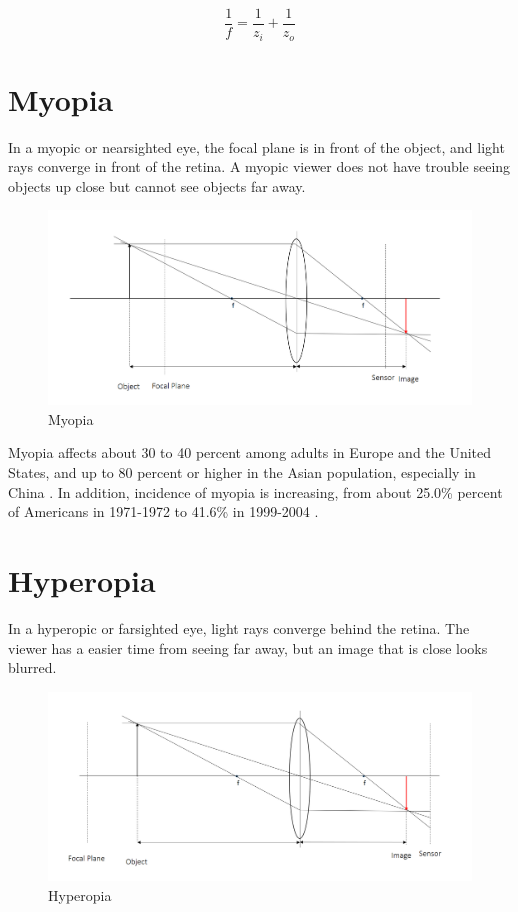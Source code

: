 $$\frac{1}{f} = \frac{1}{z_i} + \frac{1}{z_o}$$
 
\section{Myopia}
In a myopic or nearsighted eye, the focal plane is in front of the object, and light rays converge in front of the retina. A myopic viewer does not have trouble seeing objects up close but cannot see objects far away. 

\begin{figure}[h!]
  \centering
  \includegraphics[width=5.0in]{chapters/chapter2/images/myopia.png}
  \caption{Myopia}
  \label{fig:myopia}
\end{figure}

Myopia affects about 30 to 40 percent among adults in Europe and the United States, and up to 80 percent or higher in the Asian population, especially in China \cite{allaboutvision:2016}. In addition, incidence of myopia is increasing, from about 25.0\% percent of Americans in 1971-1972 to 41.6\% in 1999-2004 \cite{Vitae:2009}.


\section{Hyperopia}
In a hyperopic or farsighted eye, light rays converge behind the retina. The viewer has a easier time from seeing far away, but an image that is close looks blurred. 

\begin{figure}[h!]
  \centering
  \includegraphics[width=5.0in]{chapters/chapter2/images/hyperopia.png}
  \caption{Hyperopia}
  \label{fig:hyperopia}
\end{figure}

